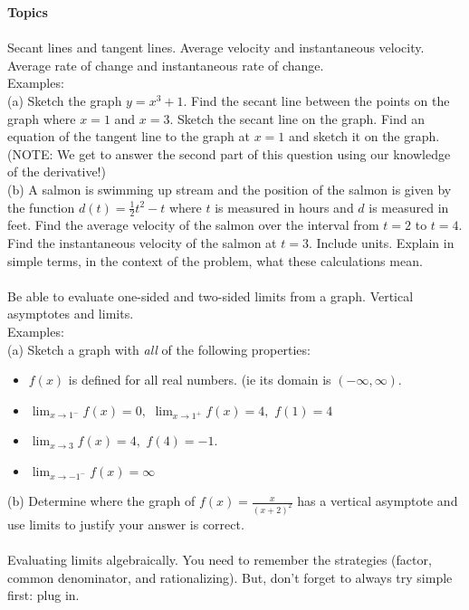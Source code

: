\documentclass[11pt,fleqn]{article}
\begin{document}
\noindent\textbf{Topics}\\

\noindent {}\\
Secant lines and tangent lines. Average velocity and instantaneous velocity. Average rate of change and instantaneous rate of change.\\

\noindent Examples: \\
(a) Sketch the graph $y=x^3+1.$ Find the secant line between the points on the graph where $x=1$ and $x=3.$ Sketch the secant line on the graph. Find an equation of the tangent line to the graph at $x=1$ and sketch it on the graph. (NOTE: We get to answer the second part of this question using our knowledge of the derivative!) \\
(b) A salmon is swimming up stream and the position of the salmon is given by the function $d(t)=\frac{1}{2}t^2-t$ where $t$ is measured in hours and $d$ is measured in feet. Find the average velocity of the salmon over the interval from $t=2$ to $t=4.$ Find the instantaneous velocity of the salmon at $t=3.$ Include units. Explain in simple terms, in the context of the problem, what these calculations mean.\\

\noindent {}\\
Be able to evaluate one-sided and two-sided limits from a graph. Vertical asymptotes and limits.\\

\noindent Examples: \\
(a) Sketch a graph with \emph{all} of the following properties: \\
\begin{itemize}
\item $f(x)$ is defined for all real numbers. (ie its domain is $(-\infty,\infty).$
\item $\lim_{x \to 1^-} f(x) = 0,$ $\lim_{x \to 1^+} f(x) =4,$ $f(1) =4$
\item $\lim_{x \to 3} f(x) =4,$ $f(4)=-1.$
\item $\lim_{x \to -1^-} f(x) =\infty$
\end{itemize}
(b) Determine where the graph of $f(x)=\frac{x}{(x+2)^2}$ has a vertical asymptote and use limits to justify your answer is correct. \\

\noindent {}\\
Evaluating limits algebraically. You need to remember the strategies (factor, common denominator, and rationalizing). But, don't forget to always try simple first: plug in. \\
\end{document}
